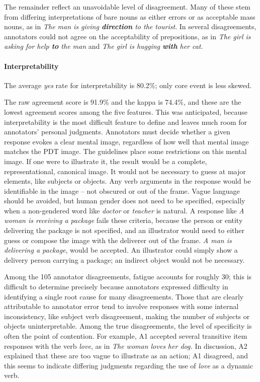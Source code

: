 \documentclass[11pt,a4paper]{article}
\begin{document}
The remainder reflect an unavoidable level of disagreement. Many of these stem from differing interpretations of bare nouns as either errors or as acceptable mass nouns, as in \textit{The man is giving \textbf{direction} to the tourist}. In several disagreements, annotators could not agree on the acceptability of prepositions, as in \textit{The girl is asking for help \textbf{to} the man} and \textit{The girl is hugging \textbf{with} her cat}.


\paragraph{Interpretability} The average \textit{yes} rate for interpretability is 80.2\%; only core event is less skewed.

The raw agreement score is 91.9\% and the kappa is 74.4\%, and these are the lowest agreement scores among the five features. This was anticipated, because interpretability is the most difficult feature to define and leaves much room for annotators' personal judgments. Annotators must decide whether a given response evokes a clear mental image, regardless of how well that mental image matches the PDT image. The guidelines place some restrictions on this mental image. If one were to illustrate it, the result would be a complete, representational, canonical image. It would not be necessary to guess at major elements, like subjects or objects. Any verb arguments in the response would be identifiable in the image -- not obscured or out of the frame. Vague language should be avoided, but human gender does not need to be specified, especially when a non-gendered word like \textit{doctor} or \textit{teacher} is natural. A response like \textit{A woman is receiving a package} fails these criteria, because the person or entity delivering the package is not specified, and an illustrator would need to either guess or compose the image with the deliverer out of the frame. \textit{A man is delivering a package}, would be accepted. An illustrator could simply show a delivery person carrying a package; an indirect object would not be necessary.

Among the 105 annotator disagreements, fatigue accounts for roughly 30; this is difficult to determine precisely because annotators expressed difficulty in identifying a single root cause for many disagreements. Those that are clearly attributable to annotator error tend to involve responses with some internal inconsistency, like subject verb disagreement, making the number of subjects or objects uninterpretable. Among the true disagreements, the level of specificity is often the point of contention. For example, A1 accepted several transitive item responses with the verb \textit{love}, as in \textit{The woman loves her dog.} In discussion, A2 explained that these are too vague to illustrate as an action; A1 disagreed, and this seems to indicate differing judgments regarding the use of \textit{love} as a dynamic verb.
\end{document}
